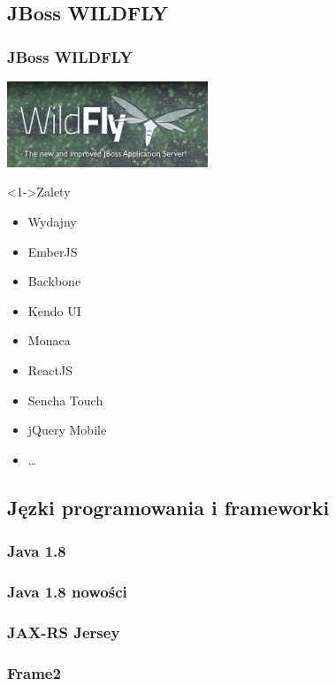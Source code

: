 \documentclass{beamer}
\begin{document}
\subsection{JBoss WILDFLY}
\begin{frame}
\frametitle{JBoss WILDFLY}
\includegraphics[width=6cm]{wildfly.jpg}

\begin{block}<1->{Zalety}
			\begin{itemize}
    \item<1-> Wydajny
    \item<2->  EmberJS
    \item<3->  Backbone
    \item<4->  Kendo UI
    \item<5-> Monaca
    \item<6->  ReactJS
    \item<6-> Sencha Touch
    \item<6->  jQuery Mobile
    \item<5-> \dots
\end{itemize}
\end{block}
\end{frame}
\subsection{Jęzki programowania i frameworki}
\subsubsection{Java 1.8 }
\begin{frame}
\frametitle{Java 1.8 nowości }
\end{frame}
\subsubsection{JAX-RS Jersey}
\begin{frame}
\frametitle{Frame2}
\end{frame}
\end{document}
